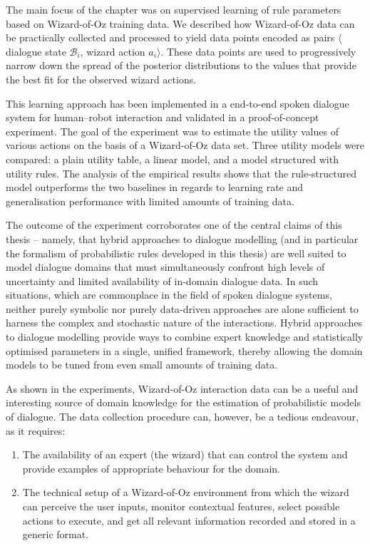 The main focus of the chapter was on supervised learning of rule parameters based on Wizard-of-Oz training data. We described how Wizard-of-Oz data can be practically collected and processed to yield data points encoded as pairs $\langle$dialogue state $\mathcal{B}_i$, wizard action $a_i\rangle$. These data points are used to progressively narrow down the spread of the posterior distributions to the values that provide the best fit for the observed wizard actions. 

This learning approach has been implemented in a end-to-end spoken dialogue system for human--robot interaction and validated in a proof-of-concept experiment.  The goal of the experiment was to estimate the utility values of various actions on the basis of a Wizard-of-Oz data set.  Three utility models were compared: a plain utility table, a linear model, and a model structured with utility rules. The analysis of the empirical results shows that the rule-structured model outperforms the two baselines in regards to learning rate and generalisation performance with limited amounts of training data.

The outcome of the experiment corroborates one of the central claims of this thesis -- namely, that hybrid approaches to dialogue modelling (and in particular the formalism of probabilistic rules developed in this thesis) are well suited to model dialogue domains that must simultaneously confront high levels of uncertainty and limited availability of in-domain dialogue data. In such situations, which are commonplace in the field of spoken dialogue systems, neither purely symbolic nor purely data-driven approaches are alone sufficient to harness the complex and stochastic nature of the interactions.  Hybrid approaches to dialogue modelling provide ways to combine expert knowledge and statistically optimised parameters in a single, unified framework, thereby allowing the domain models to be tuned from even small amounts of training data. 

As shown in the experiments, Wizard-of-Oz interaction data can be a useful and interesting source of domain knowledge for the estimation of probabilistic models of dialogue. The data collection procedure can, however, be a tedious endeavour, as it requires:
\begin{enumerate}
\item The availability of an expert (the wizard) that can control the system and provide examples of appropriate behaviour for the domain.
\item The technical setup of a Wizard-of-Oz environment from which the wizard can perceive the user inputs, monitor contextual features, select possible actions to execute, and get all relevant information recorded and stored in a generic format. 
\end{enumerate}

